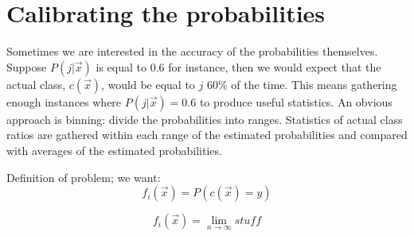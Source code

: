 \documentclass{article}
\begin{document}
\section{Calibrating the probabilities}

Sometimes we are interested in the accuracy of the probabilities themselves.
Suppose $P(j|\vec x)$ is equal to 0.6 for instance, then we would expect
that the actual class, $c(\vec x)$, would be equal to $j$ 60\% of the time.
This means gathering enough instances where $P(j|\vec x)=0.6$ to produce
useful statistics.
An obvious approach is binning: divide the probabilities into ranges.
Statistics of actual class ratios are gathered within each range of the estimated
probabilities and compared with averages of the estimated probabilities.

Definition of problem; we want:
\begin{equation}
	f_i(\vec x) = P(c(\vec x)=y)
\end{equation}

\begin{equation}
	f_i(\vec x) = \lim_{n \rightarrow \infty} stuff
\end{equation}

 
\end{document}
